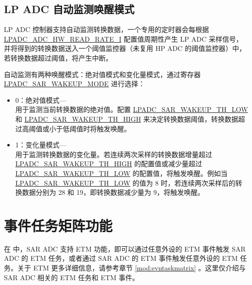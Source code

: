 \documentclass[main\_\_CN.tex]{subfiles}
\begin{document}
\subsection{LP ADC 自动监测唤醒模式}

LP ADC 控制器支持自动监测转换数据，一个专用的定时器会每根据 \hyperref[fielddesc:LPADCADC1HWREADRATEI]{LPADC\_ADC\_HW\_READ\_RATE\_I} 配置值周期性产生 LP ADC 采样信号，并将得到的转换数据送入一个阈值监控器（未复用 HP ADC 的阈值监控器）中，若转换数据超过阈值，将产生中断。

自动监测有两种唤醒模式：绝对值模式和变化量模式，通过寄存器 \hyperref[fielddesc:LPADCSAR1WAKEUPMODE]{LPADC\_SAR\_WAKEUP\_MODE} 进行选择：

   \begin{itemize}
       \item 0：绝对值模式––\\
        用于监测当前转换数据的绝对值。配置 \hyperref[fielddesc:LPADCSAR1WAKEUPTHLOW]{LPADC\_SAR\_WAKEUP\_TH\_LOW} 和 \hyperref[fielddesc:LPADCSAR1WAKEUPTHHIGH]{LPADC\_SAR\_WAKEUP\_TH\_HIGH} 来决定转换数据阈值，转换数据超过高阈值或小于低阈值时将触发唤醒。

       \item 1：变化量模式––\\
        用于监测转换数据的变化量。若连续两次采样的转换数据增量超过 \hyperref[fielddesc:LPADCSAR1WAKEUPTHHIGH]{LPADC\_SAR\_WAKEUP\_TH\_HIGH} 的配置值或减少量超过 \hyperref[fielddesc:LPADCSAR1WAKEUPTHLOW]{LPADC\_SAR\_WAKEUP\_TH\_LOW} 的配置值，将触发唤醒。例如当 \hyperref[fielddesc:LPADCSAR1WAKEUPTHLOW]{LPADC\_SAR\_WAKEUP\_TH\_LOW} 的值为 8 时，若连续两次采样后的转换数据分别为 28 和 19，即转换数据减少量为 9，将触发唤醒。

    \end{itemize}




\section{事件任务矩阵功能}
\label{sec:etm-func}


在 \chipname{} 中，SAR ADC 支持 ETM 功能，即可以通过任意外设的 ETM 事件触发 SAR ADC 的 ETM 任务，或者通过 SAR ADC 的 ETM 事件触发任意外设的 ETM 任务。关于 ETM 更多详细信息，请参考章节 \ref{mod:evntaskmatrix} 。这里仅介绍与 SAR ADC 相关的 ETM 任务和 ETM 事件。
\end{document}
